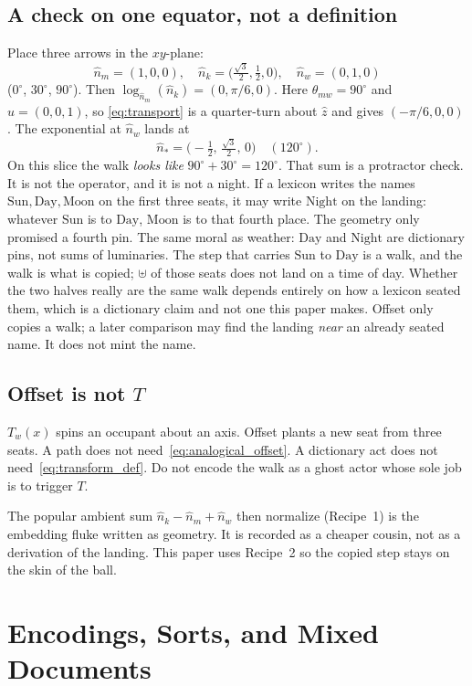 \documentclass[12pt, a4paper]{article}
\begin{document}
\subsection{A check on one equator, not a definition}
\label{subsec:offset_equator}
Place three arrows in the $xy$-plane:
\[
\hat n_m=(1,0,0),\quad
\hat n_k=\bigl(\tfrac{\sqrt{3}}{2},\tfrac12,0\bigr),\quad
\hat n_w=(0,1,0)
\]
($0^\circ$, $30^\circ$, $90^\circ$). Then
$\log_{\hat n_m}(\hat n_k)=(0,\pi/6,0)$.
Here $\theta_{mw}=90^\circ$ and $\hat u=(0,0,1)$, so
\eqref{eq:transport} is a quarter-turn about $\hat z$ and gives
$(-\pi/6,0,0)$. The exponential at
$\hat n_w$ lands at
\[
\hat n_{*}=\bigl(-\tfrac12,\,\tfrac{\sqrt{3}}{2},\,0\bigr)
\quad (120^\circ).
\]
On this slice the walk \emph{looks like} $90^\circ+30^\circ=120^\circ$.
That sum is a protractor check. It is not the operator, and it is
not a night. If a lexicon writes the names
$\mathrm{Sun},\mathrm{Day},\mathrm{Moon}$ on the first three seats,
it may write $\mathrm{Night}$ on the landing: whatever $\mathrm{Sun}$
is to $\mathrm{Day}$, $\mathrm{Moon}$ is to that fourth place. The
geometry only promised a fourth pin.
The same moral as weather: $\mathrm{Day}$ and $\mathrm{Night}$
are dictionary pins, not sums of luminaries. The step that carries
$\mathrm{Sun}$ to $\mathrm{Day}$ is a walk, and the walk is what is
copied; $\uplus$ of those seats does not land on a time of day.
Whether the two halves really are the same walk depends entirely on
how a lexicon seated them, which is a dictionary claim and not one
this paper makes. Offset only copies a walk; a later comparison
may find the landing \emph{near} an already seated name. It does
not mint the name.

\subsection{Offset is not $T$}
\label{subsec:offset_not_T}
$T_w(x)$ spins an occupant about an axis. Offset plants a new seat
from three seats. A path does not need~\eqref{eq:analogical_offset}.
A dictionary act does not need~\eqref{eq:transform_def}. Do not
encode the walk as a ghost actor whose sole job is to trigger $T$.

The popular ambient sum $\hat n_k-\hat n_m+\hat n_w$ then
normalize (Recipe~1) is the embedding fluke written as geometry.
It is recorded as a cheaper cousin, not as a derivation of the
landing. This paper uses Recipe~2 so the copied step
stays on the skin of the ball.

\section{Encodings, Sorts, and Mixed Documents}
\label{sec:encodings_sorts}
\end{document}
